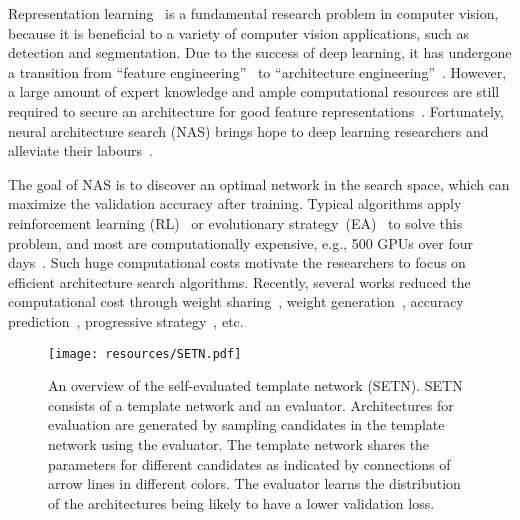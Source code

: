 \documentclass[10pt,twocolumn,letterpaper]{article}
\def\NAME{{SETN}}
\begin{document}
Representation learning~\cite{bengio2013representation} is a fundamental research problem in computer vision, because it is beneficial to a variety of computer vision applications, such as detection and segmentation.
Due to the success of deep learning, it has undergone a transition from ``feature engineering''~\cite{lowe1999object,dalal2005histograms} to ``architecture engineering''~\cite{szegedy2015going,huang2017densely,simonyan2015very,liu2019ppn,he2016deep,dong2017more}. However, a large amount of expert knowledge and ample computational resources are still required to secure an architecture for good feature representations~\cite{zoph2017NAS}.
Fortunately, neural architecture search (NAS) brings hope to deep learning researchers and alleviate their labours~\cite{Zoph_2018_CVPR,pmlr-v80-pham18a}.



The goal of NAS is to discover an optimal network in the search space, which can maximize the validation accuracy after training. Typical algorithms apply reinforcement learning (RL)~\cite{zoph2017NAS,Zoph_2018_CVPR,pmlr-v80-pham18a,chen2019renas} or evolutionary strategy~(EA)~\cite{liu2018hierarchical,real2019regularized} to solve this problem, and most are computationally expensive, e.g., 500 GPUs over four days~\cite{Zoph_2018_CVPR}. Such huge computational costs motivate the researchers to focus on efficient architecture search algorithms. Recently, several works reduced the computational cost through weight sharing~\cite{pmlr-v80-pham18a,cai2018efficient}, weight generation~\cite{brock2018smash,bender2018understanding}, accuracy prediction~\cite{baker2018accelerating,klein2017learning}, progressive strategy~\cite{Liu_2018_ECCV}, etc.



\begin{figure}[t!]
\begin{center}
\texttt{[image: resources/SETN.pdf]}
\end{center}
\vspace{-3mm}
\caption{
An overview of the self-evaluated template network ({\NAME}). 
{\NAME} consists of a template network and an evaluator.
Architectures for evaluation are generated by sampling candidates in the template network using the evaluator.
The template network shares the parameters for different candidates as indicated by connections of arrow lines in different colors. The evaluator learns the distribution of the architectures being likely to have a lower validation loss.
}
\vspace{-2mm}
\label{fig:intro}
\end{figure}
\end{document}
